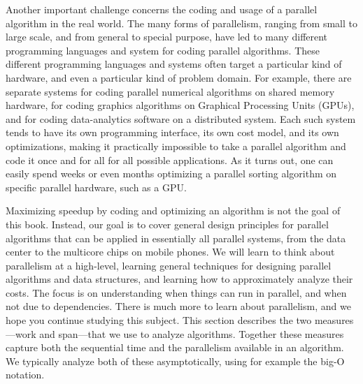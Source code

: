Another important challenge concerns the coding and usage of a
parallel algorithm in the real world.
%
The many forms of parallelism, ranging from small to large scale, and
from general to special purpose, have led to many different programming
languages and system for coding parallel algorithms.
%
These different programming languages and systems often target a
particular kind of hardware, and even a particular kind of problem
domain.  
%
For example, there are separate systems for coding parallel numerical
algorithms on shared memory hardware, for coding graphics algorithms
on Graphical Processing Units (GPUs), and for coding data-analytics
software on a distributed system.
%
Each such system tends to have its own programming interface, its own
cost model, and its own optimizations, making it practically
impossible to take a parallel algorithm and code it once and for all
for all possible applications.
%
As it turns out, one can easily spend weeks or even months optimizing a
parallel sorting algorithm on specific parallel hardware, such as a GPU.



Maximizing speedup by coding and optimizing an algorithm is not the
goal of this book.
%
Instead, our goal is to cover general design principles for parallel
algorithms that can be applied in essentially all parallel systems,
from the data center to the multicore chips on mobile phones.
%
We will learn to think about parallelism at a high-level, learning
general techniques for designing parallel algorithms and data
structures, and learning how to approximately analyze their costs.
%
The focus is on understanding when things can run in parallel, and
when not due to dependencies.  
%
There is much more to learn about parallelism, and we hope you
continue studying this subject.
This section describes the two measures---work and span---that we use
to analyze algorithms.  Together these measures capture both the
sequential time and the parallelism available in an algorithm.
%
We typically analyze both of these asymptotically, using
for example the big-O notation.
%

